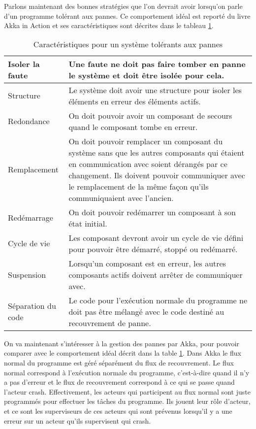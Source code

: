 \documentclass[11pt, a4paper]{article}
\begin{document}
\par Parlons maintenant des bonnes stratégies que l'on devrait avoir lorsqu'on parle d'un programme tolérant aux pannes. Ce comportement idéal est reporté du livre Akka in Action \cite{roestenburg2015akka} et ses caractéristiques sont décrites dans le tableau \ref{table1}.
\newline

\begin{table}[h]
\centering
\begin{tabular}{|l|p{}|}
\hline
Isoler la faute & Une faute ne doit pas faire tomber en panne le système et doit être isolée pour cela.\\ \hline
Structure & Le système doit avoir une structure pour isoler les éléments en erreur des éléments actifs. \\ \hline
Redondance & On doit pouvoir avoir un composant de secours quand le composant tombe en erreur.\\ \hline
Remplacement & On doit pouvoir remplacer un composant du système sans que les autres composants qui étaient en communication avec soient dérangés par ce changement. Ils doivent pouvoir communiquer avec le remplacement de la même façon qu'ils communiquaient avec l'ancien. \\ \hline
Redémarrage & On doit pouvoir redémarrer un composant à son état initial. \\ \hline
Cycle de vie & Les composant devront avoir un cycle de vie défini pour pouvoir être démarré, stoppé ou redémarré. \\ \hline
Suspension & Lorsqu'un composant est en erreur, les autres composants actifs doivent arrêter de communiquer avec. \\ \hline
Séparation du code & Le code pour l’exécution normale du programme ne doit pas être mélangé avec le code destiné au recouvrement de panne. \\ \hline
\end{tabular}
\caption{Caractéristiques pour un système tolérants aux pannes}
\label{table1}
\end{table}
\par On va maintenant s'intéresser à la gestion des pannes par Akka, pour pouvoir comparer avec le comportement idéal décrit dans la table \ref{table1}. Dans Akka le flux normal du programme est géré séparément du flux de recouvrement. Le flux normal correspond à l’exécution normale du programme, c'est-à-dire quand il n'y a pas d'erreur et le flux de recouvrement correspond à ce qui se passe quand l'acteur crash. Effectivement, les acteurs qui participent au flux normal sont juste programmés pour effectuer les tâches du programme. Ils jouent leur rôle d'acteur, et ce sont les superviseurs de ces acteurs qui sont prévenus lorsqu'il y a une erreur sur un acteur qu'ils supervisent qui crash. 
\end{document}
